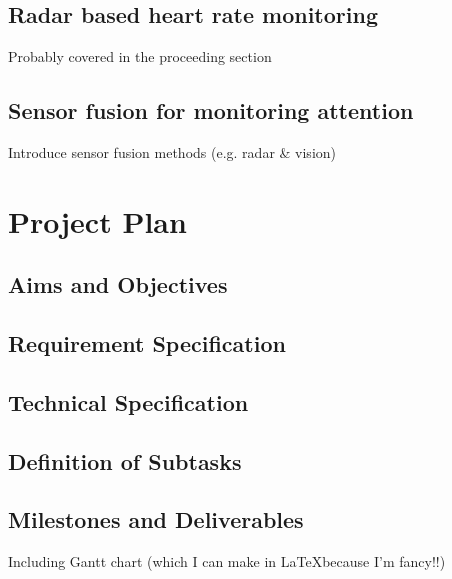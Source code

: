 \documentclass[11pt, parskip=half*,twoside=false]{scrbook}
\begin{document}
\section{Radar based heart rate monitoring}
Probably covered in the proceeding section

\section{Sensor fusion for monitoring attention}
Introduce sensor fusion methods (e.g. radar \& vision)

\chapter{Project Plan}
\section{Aims and Objectives}

\section{Requirement Specification}

\section{Technical Specification}

\section{Definition of Subtasks}

\section{Milestones and Deliverables}
Including Gantt chart (which I can make in \LaTeX because I'm fancy!!)


\end{document}
